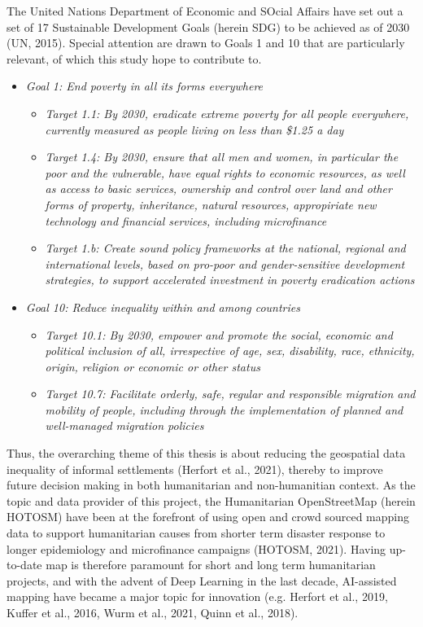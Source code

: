 \documentclass[11pt, a4paper, twoside]{report}
\begin{document}
The United Nations Department of Economic and SOcial Affairs have set out a set of 17 Sustainable Development Goals (herein SDG) to be achieved as of 2030 (UN, 2015). Special attention are drawn to Goals 1 and 10 that are particularly relevant, of which this study hope to contribute to.\\\par

\begin{itemize}
  \item \textit{Goal 1: End poverty in all its forms everywhere}
  \begin{itemize}
    \item \textit{Target 1.1: By 2030, eradicate extreme poverty for all people everywhere, currently measured as people living on less than \$1.25 a day}
    \item \textit{Target 1.4: By 2030, ensure that all men and women, in particular the poor and the vulnerable, have equal rights to economic resources, as well as access to basic services, ownership and control over land and other forms of property, inheritance, natural resources, appropiriate new technology and financial services, including microfinance}
    \item \textit{Target 1.b: Create sound policy frameworks at the national, regional and international levels, based on pro-poor and gender-sensitive development strategies, to support accelerated investment in poverty eradication actions}
  \end{itemize}
  \item \textit{Goal 10: Reduce inequality within and among countries}
  \begin{itemize}
    \item \textit{Target 10.1: By 2030, empower and promote the social, economic and political inclusion of all, irrespective of age, sex, disability, race, ethnicity, origin, religion or economic or other status}
    \item \textit{Target 10.7: Facilitate orderly, safe, regular and responsible migration and mobility of people, including through the implementation of planned and well-managed migration policies}
  \end{itemize}
\end{itemize}
\newline

Thus, the overarching theme of this thesis is about reducing the geospatial data inequality of informal settlements (Herfort et al., 2021), thereby to improve future decision making in both humanitarian and non-humanitian context. As the topic and data provider of this project, the Humanitarian OpenStreetMap (herein HOTOSM) have been at the forefront of using open and crowd sourced mapping data to support humanitarian causes from shorter term disaster response to longer epidemiology and microfinance campaigns (HOTOSM, 2021). Having up-to-date map is therefore paramount for short and long term humanitarian projects, and with the advent of Deep Learning in the last decade, AI-assisted mapping have became a major topic for innovation (e.g. Herfort et al., 2019, Kuffer et al., 2016, Wurm et al., 2021, Quinn et al., 2018).
\end{document}

